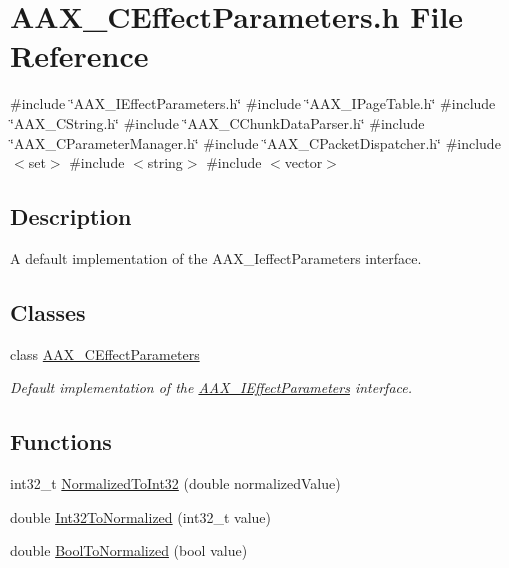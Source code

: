 \hypertarget{a00428}{}\section{A\+A\+X\+\_\+\+C\+Effect\+Parameters.\+h File Reference}
\label{a00428}
{\ttfamily \#include \char`\"{}A\+A\+X\+\_\+\+I\+Effect\+Parameters.\+h\char`\"{}}\newline
{\ttfamily \#include \char`\"{}A\+A\+X\+\_\+\+I\+Page\+Table.\+h\char`\"{}}\newline
{\ttfamily \#include \char`\"{}A\+A\+X\+\_\+\+C\+String.\+h\char`\"{}}\newline
{\ttfamily \#include \char`\"{}A\+A\+X\+\_\+\+C\+Chunk\+Data\+Parser.\+h\char`\"{}}\newline
{\ttfamily \#include \char`\"{}A\+A\+X\+\_\+\+C\+Parameter\+Manager.\+h\char`\"{}}\newline
{\ttfamily \#include \char`\"{}A\+A\+X\+\_\+\+C\+Packet\+Dispatcher.\+h\char`\"{}}\newline
{\ttfamily \#include $<$set$>$}\newline
{\ttfamily \#include $<$string$>$}\newline
{\ttfamily \#include $<$vector$>$}\newline


\subsection{Description}
A default implementation of the A\+A\+X\+\_\+\+Ieffect\+Parameters interface. 

\subsection*{Classes}
\begin{DoxyCompactItemize}
\item 
class \mbox{\hyperlink{a01481}{A\+A\+X\+\_\+\+C\+Effect\+Parameters}}
\begin{DoxyCompactList}\small\item\em Default implementation of the \mbox{\hyperlink{a01825}{A\+A\+X\+\_\+\+I\+Effect\+Parameters}} interface. \end{DoxyCompactList}\end{DoxyCompactItemize}
\subsection*{Functions}
\begin{DoxyCompactItemize}
\item 
int32\+\_\+t \mbox{\hyperlink{a00428_a4306a7c219b052f8d50910b40247805f}{Normalized\+To\+Int32}} (double normalized\+Value)
\item 
double \mbox{\hyperlink{a00428_aae1cabc9311a708ba440fc539607e68b}{Int32\+To\+Normalized}} (int32\+\_\+t value)
\item 
double \mbox{\hyperlink{a00428_aa07cfc71944518e3d089d18eabdfa4aa}{Bool\+To\+Normalized}} (bool value)
\end{DoxyCompactItemize}

